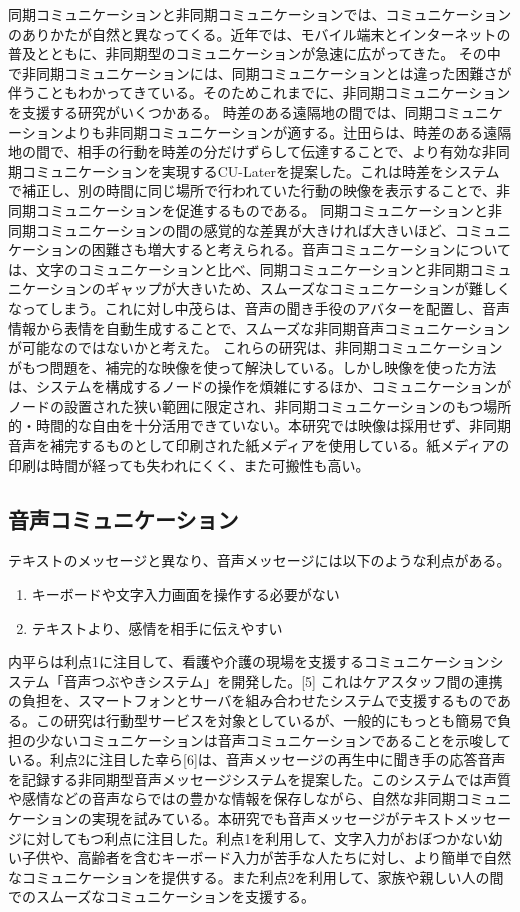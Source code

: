 \documentclass[submit,techrep,noauthor]{ipsj}
\begin{document}
同期コミュニケーションと非同期コミュニケーションでは、コミュニケーションのありかたが自然と異なってくる。近年では、モバイル端末とインターネットの普及とともに、非同期型のコミュニケーションが急速に広がってきた。
その中で非同期コミュニケーションには、同期コミュニケーションとは違った困難さが伴うこともわかってきている。そのためこれまでに、非同期コミュニケーションを支援する研究がいくつかある。
時差のある遠隔地の間では、同期コミュニケーションよりも非同期コミュニケーションが適する。辻田らは、時差のある遠隔地の間で、相手の行動を時差の分だけずらして伝達することで、より有効な非同期コミュニケーションを実現するCU-Laterを提案した。これは時差をシステムで補正し、別の時間に同じ場所で行われていた行動の映像を表示することで、非同期コミュニケーションを促進するものである。
同期コミュニケーションと非同期コミュニケーションの間の感覚的な差異が大きければ大きいほど、コミュニケーションの困難さも増大すると考えられる。音声コミュニケーションについては、文字のコミュニケーションと比べ、同期コミュニケーションと非同期コミュニケーションのギャップが大きいため、スムーズなコミュニケーションが難しくなってしまう。これに対し中茂らは、音声の聞き手役のアバターを配置し、音声情報から表情を自動生成することで、スムーズな非同期音声コミュニケーションが可能なのではないかと考えた。
これらの研究は、非同期コミュニケーションがもつ問題を、補完的な映像を使って解決している。しかし映像を使った方法は、システムを構成するノードの操作を煩雑にするほか、コミュニケーションがノードの設置された狭い範囲に限定され、非同期コミュニケーションのもつ場所的・時間的な自由を十分活用できていない。本研究では映像は採用せず、非同期音声を補完するものとして印刷された紙メディアを使用している。紙メディアの印刷は時間が経っても失われにくく、また可搬性も高い。

\subsection{音声コミュニケーション}
テキストのメッセージと異なり、音声メッセージには以下のような利点がある。
\begin{enumerate}
    \item キーボードや文字入力画面を操作する必要がない
    \item テキストより、感情を相手に伝えやすい
\end{enumerate}
内平らは利点1に注目して、看護や介護の現場を支援するコミュニケーションシステム「音声つぶやきシステム」を開発した。[5] これはケアスタッフ間の連携の負担を、スマートフォンとサーバを組み合わせたシステムで支援するものである。この研究は行動型サービスを対象としているが、一般的にもっとも簡易で負担の少ないコミュニケーションは音声コミュニケーションであることを示唆している。利点2に注目した幸ら[6]は、音声メッセージの再生中に聞き手の応答音声を記録する非同期型音声メッセージシステムを提案した。このシステムでは声質や感情などの音声ならではの豊かな情報を保存しながら、自然な非同期コミュニケーションの実現を試みている。本研究でも音声メッセージがテキストメッセージに対してもつ利点に注目した。利点1を利用して、文字入力がおぼつかない幼い子供や、高齢者を含むキーボード入力が苦手な人たちに対し、より簡単で自然なコミュニケーションを提供する。また利点2を利用して、家族や親しい人の間でのスムーズなコミュニケーションを支援する。
\end{document}
